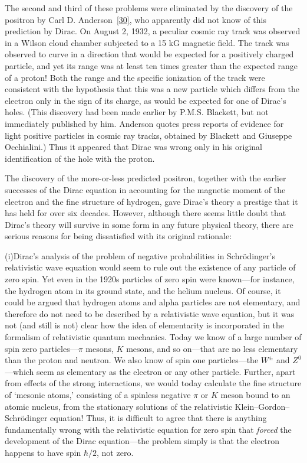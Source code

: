 The second and third of these problems were eliminated by the discovery
of the positron by Carl D. Anderson~\hyperref[ref:1.30]{[30]}, who apparently did not know of
this prediction by Dirac. On August 2, 1932, a peculiar cosmic ray track
was observed in a Wilson cloud chamber subjected to a 15 kG magnetic
field. The track was observed to curve in a direction that would be
expected for a positively charged particle, and yet its range was at least
ten times greater than the expected range of a proton! Both the range
and the specific ionization of the track were consistent with the hypothesis
that this was a new particle which differs from the electron only in the
sign of its charge, as would be expected for one of Dirac's holes. (This
discovery had been made earlier by P.M.S. Blackett, but not immediately
published by him. Anderson quotes press reports of evidence for light
positive particles in cosmic ray tracks, obtained by Blackett and Giuseppe
Occhialini.) Thus it appeared that Dirac was wrong only in his original
identification of the hole with the proton.

The discovery of the more-or-less predicted positron, together with the
earlier successes of the Dirac equation in accounting for the magnetic
moment of the electron and the fine structure of hydrogen, gave Dirac's
theory a prestige that it has held for over six decades. However, although
there seems little doubt that Dirac's theory will survive in some form in
any future physical theory, there are serious reasons for being dissatisfied
with its original rationale:

\medskip
\noindent
(i)\quad Dirac's analysis of the problem of negative probabilities in Schr\"odinger's
relativistic wave equation would seem to rule out the existence
of any particle of zero spin. Yet even in the 1920s particles of zero spin
were known---for instance, the hydrogen atom in its ground state, and
the helium nucleus. Of course, it could be argued that hydrogen atoms
and alpha particles are not elementary, and therefore do not need to
be described by a relativistic wave equation, but it was not (and still is
not) clear how the idea of elementarity is incorporated in the formalism
of relativistic quantum mechanics. Today we know of a large number
of spin zero particles---$\pi$ mesons, $K$ mesons, and so on---that are
no less elementary than the proton and neutron. We also know of spin
one particles---the $W^\pm$ and $Z^0$---which seem as elementary as the
electron or any other particle. Further, apart from effects of the strong
interactions, we would today calculate the fine structure of `mesonic
atoms,' consisting of a spinless negative $\pi$ or $K$ meson bound to an
atomic nucleus, from the stationary solutions of the relativistic Klein--Gordon--Schr\"odinger equation! Thus, it is difficult to agree that there is
anything fundamentally wrong with the relativistic equation for zero spin
that \emph{forced} the development of the Dirac equation---the problem simply
is that the electron happens to have spin $\hbar/2$, not zero.

